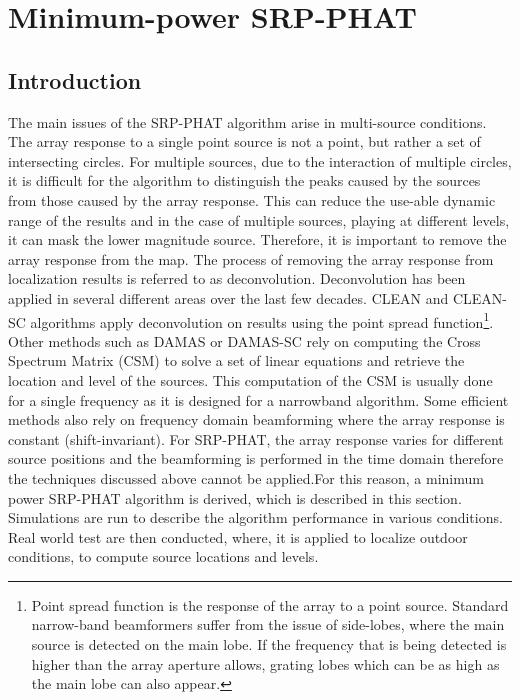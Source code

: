 \chapter{Minimum-power SRP-PHAT}
\section{Introduction}
The main issues of the SRP-PHAT algorithm arise in multi-source conditions. The array response to a single point source is not a point, but rather a set of intersecting circles.
For multiple sources, due to the interaction of multiple circles, it is difficult for the algorithm to distinguish the peaks caused by the sources from those caused by the array response. This can reduce the use-able dynamic range of the results and in the case of multiple sources, playing at different levels, it can mask the lower magnitude source. Therefore, it is important to remove the array response from the map. The process of removing the array response from localization results is referred to as deconvolution.
Deconvolution has been applied in several different areas over the last few decades. CLEAN and CLEAN-SC algorithms apply deconvolution on results using the point spread function\footnote{Point spread function is the response of the array to a point source. Standard narrow-band beamformers suffer from the issue of side-lobes, where the main source is detected on the main lobe. If the frequency that is being detected is higher than the array aperture allows, grating lobes which can be as high as the main lobe can also appear.}. Other methods such as DAMAS or DAMAS-SC rely on computing the Cross Spectrum Matrix (CSM) to solve a set of linear equations and retrieve the location and level of the sources. This computation of the CSM is usually done for a single frequency as it is designed for a narrowband algorithm. 
Some efficient methods also rely on frequency domain beamforming where the array response is constant (shift-invariant). For SRP-PHAT, the array response varies for different source positions and the beamforming is performed in the time domain therefore the techniques discussed above cannot be applied.For this reason, a minimum power SRP-PHAT algorithm is derived, which is described in this section. Simulations are run to describe the algorithm performance in various conditions. Real world test are then conducted, where, it is applied to localize outdoor conditions, to compute source locations and levels. %
